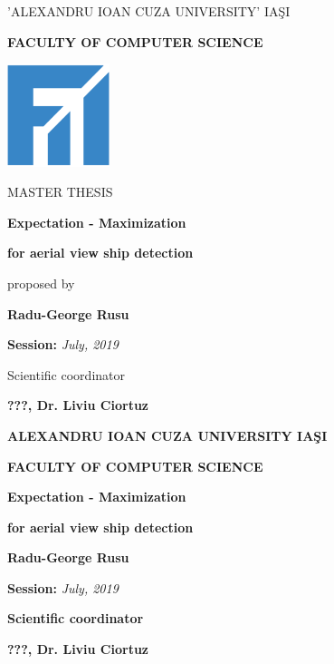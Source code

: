 \documentclass[a4paper, 12pt, oneside]{Thesis}  %
\begin{document}
\pagestyle{empty}
\centerline{\small{'ALEXANDRU IOAN CUZA UNIVERSITY' IA\c SI}}
\vspace{0.5cm}
\centerline{\textbf{\Large{\textsf{FACULTY OF COMPUTER SCIENCE}}}}
\vspace{3cm}
\begin{center}
	\includegraphics[width=3cm,height=3cm]{Pictures/fii-01.png}
\end{center}
\vspace{3cm}
\centerline{\Large{MASTER THESIS}}
\vspace{1cm}
\centerline{\textbf{\LARGE{Expectation - Maximization}}}
\vspace{0.2cm}
\centerline{\textbf{\LARGE{for aerial view ship detection}}}
\vspace{1cm}
\centerline{proposed by}
\vspace{1cm}
\centerline{\textbf{\Large{\textsf{Radu-George Rusu}}}}
\vspace{2cm}
\centerline{\textsf{\textbf{Session:} \textit{July, 2019}}}
\vspace{0.5cm}
\centerline{Scientific coordinator}
\vspace{0.5cm}
\centerline{\textsf{\textbf{\large{???, Dr. Liviu Ciortuz}}}}

\clearpage

\pagestyle{empty}
\centerline{\textbf{\large{\textsf{ALEXANDRU IOAN CUZA UNIVERSITY IA\c SI}}}}
\vspace{0.5cm}
\centerline{\textbf{\large{\textsf{FACULTY OF COMPUTER SCIENCE}}}}
\vspace{5cm}
\centerline{\textbf{\LARGE{Expectation - Maximization}}}
\vspace{0.2cm}
\centerline{\textbf{\LARGE{for aerial view ship detection}}}
\vspace{3cm}
\centerline{\textbf{\Large{\textsf{Radu-George Rusu}}}}
\vspace{2cm}
\centerline{\Large{{\textsf{\textbf{Session:} \textit{July, 2019}}}}}
\vspace{4.5cm}
\centerline{\textbf{Scientific coordinator}}
\vspace{0.5cm}
\centerline{\textsf{\textbf{\large{???, Dr. Liviu Ciortuz}}}}
\end{document}
